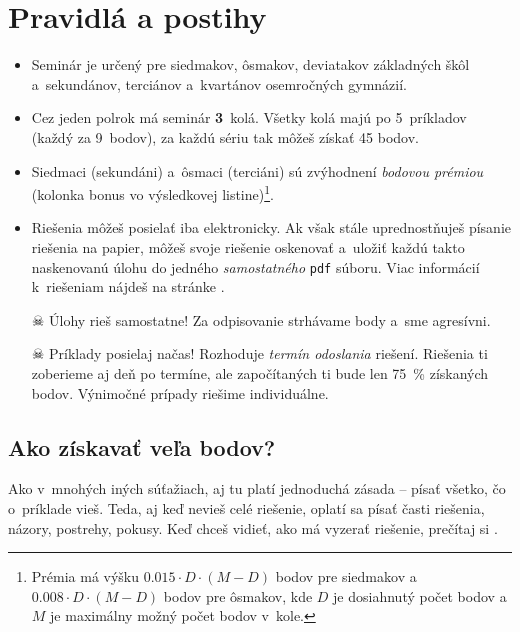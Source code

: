 \pagestyle{rules}

\section{Pravidlá a postihy}
\begin{itemize}
    \item Seminár je určený pre siedmakov, ôsmakov, deviatakov základných škôl a~sekundánov, terciánov a~kvartánov osemročných gymnázií. 

    \item Cez jeden polrok má seminár \textbf{3}~kolá. Všetky kolá majú po 5~príkladov (každý za 9~bodov), za každú sériu tak môžeš získať 45 bodov.

    \item Siedmaci (sekundáni) a~ôsmaci (terciáni) sú zvýhodnení \emph{bodovou prémiou} (kolonka bonus vo výsledkovej
        listine)\footnote{Prémia má výšku $\num{0.015} \cdot D \cdot (M - D)$ bodov pre siedmakov a $\num{0.008} \cdot D \cdot (M - D)$ bodov pre ôsmakov,
        kde $D$ je dosiahnutý počet bodov a $M$ je maximálny možný počet bodov v~kole.}.

    \item Riešenia môžeš posielať iba elektronicky. Ak však stále uprednostňuješ písanie riešenia na papier,
        môžeš svoje riešenie oskenovať a~uložiť každú takto naskenovanú úlohu do jedného \emph{samostatného} \texttt{pdf} súboru.
        Viac informácií k~riešeniam nájdeš na stránke .

    \item[$\skull$] Úlohy rieš samostatne! Za odpisovanie strhávame body a~sme agresívni. 

    \item[$\skull$] Príklady posielaj načas! Rozhoduje \emph{termín odoslania} riešení. Riešenia ti zoberieme
        aj deň po termíne, ale započítaných ti bude len \SI{75}{\percent} získaných bodov. Výnimočné prípady riešime individuálne.
\end{itemize}

\subsection{Ako získavať veľa bodov?}
    Ako v~mnohých iných súťažiach, aj tu platí jednoduchá zásada -- písať všetko, čo o~príklade vieš. Teda, aj keď nevieš celé riešenie, oplatí sa písať časti
    riešenia, názory, postrehy, pokusy. Keď chceš vidieť, ako má vyzerať riešenie, prečítaj si . 

